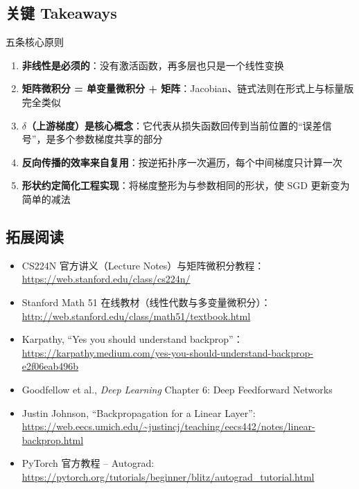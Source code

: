 \documentclass[a4paper]{article}
\begin{document}
\subsection{关键 Takeaways}

\begin{importantbox}{五条核心原则}
\begin{enumerate}
    \item \textbf{非线性是必须的}：没有激活函数，再多层也只是一个线性变换
    \item \textbf{矩阵微积分 = 单变量微积分 + 矩阵}：Jacobian、链式法则在形式上与标量版完全类似
    \item \textbf{$\delta$（上游梯度）是核心概念}：它代表从损失函数回传到当前位置的``误差信号''，是多个参数梯度共享的部分
    \item \textbf{反向传播的效率来自复用}：按逆拓扑序一次遍历，每个中间梯度只计算一次
    \item \textbf{形状约定简化工程实现}：将梯度整形为与参数相同的形状，使 SGD 更新变为简单的减法
\end{enumerate}
\end{importantbox}

\subsection{拓展阅读}

\begin{itemize}
    \item CS224N 官方讲义（Lecture Notes）与矩阵微积分教程：\url{https://web.stanford.edu/class/cs224n/}
    \item Stanford Math 51 在线教材（线性代数与多变量微积分）：\url{http://web.stanford.edu/class/math51/textbook.html}
    \item Karpathy, ``Yes you should understand backprop''：\url{https://karpathy.medium.com/yes-you-should-understand-backprop-e2f06eab496b}
    \item Goodfellow et al., \textit{Deep Learning} Chapter 6: Deep Feedforward Networks
    \item Justin Johnson, ``Backpropagation for a Linear Layer'': \url{https://web.eecs.umich.edu/~justincj/teaching/eecs442/notes/linear-backprop.html}
    \item PyTorch 官方教程 -- Autograd: \url{https://pytorch.org/tutorials/beginner/blitz/autograd_tutorial.html}
\end{itemize}
\end{document}
